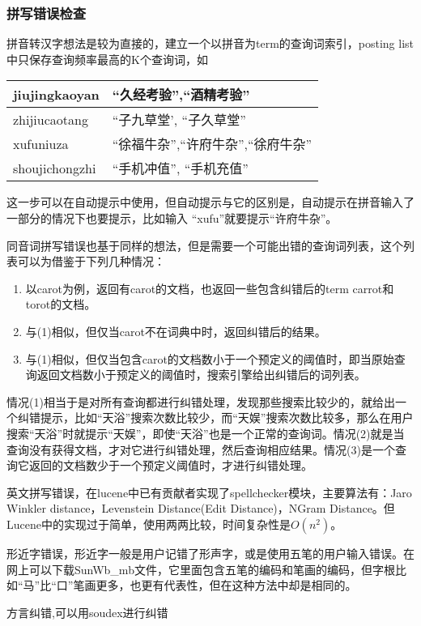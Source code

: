 \subsubsection{拼写错误检查}
\par 拼音转汉字想法是较为直接的，建立一个以拼音为term的查询词索引，posting list中只保存查询频率最高的K个查询词，如
\begin{table}[h]
  \centering
  \begin{tabular}{|l|l|}
\hline
jiujingkaoyan &“久经考验”,“酒精考验”\\ \hline
zhijiucaotang & “子九草堂', “子久草堂” \\ \hline
xufuniuza & “徐福牛杂”,“许府牛杂”,“徐府牛杂”\\ \hline
shoujichongzhi&“手机冲值”, “手机充值”\\ \hline
  \end{tabular}
\end{table}
\par 这一步可以在自动提示中使用，但自动提示与它的区别是，自动提示在拼音输入了一部分的情况下也要提示，比如输入 “xufu”就要提示“许府牛杂”。
\par 同音词拼写错误也基于同样的想法，但是需要一个可能出错的查询词列表，这个列表可以为借鉴于下列几种情况：
\begin{enumerate}[(1)]
\item 以carot为例，返回有carot的文档，也返回一些包含纠错后的term carrot和torot的文档。
\item 与(1)相似，但仅当carot不在词典中时，返回纠错后的结果。
\item 与(1)相似，但仅当包含carot的文档数小于一个预定义的阈值时，即当原始查询返回文档数小于预定义的阈值时，搜索引擎给出纠错后的词列表。
\end{enumerate}
\par 情况(1)相当于是对所有查询都进行纠错处理，发现那些搜索比较少的，就给出一个纠错提示，比如“天浴”搜索次数比较少，而“天娱”搜索次数比较多，那么在用户搜索“天浴”时就提示“天娱”，即使“天浴”也是一个正常的查询词。情况(2)就是当查询没有获得文档，才对它进行纠错处理，然后查询相应结果。情况(3)是一个查询它返回的文档数少于一个预定义阈值时，才进行纠错处理。
\par 英文拼写错误，在lucene中已有贡献者实现了spellchecker模块，主要算法有：Jaro Winkler distance，Levenstein Distance(Edit Distance)，NGram Distance。但Lucene中的实现过于简单，使用两两比较，时间复杂性是$O(n^2)$。
\par 形近字错误，形近字一般是用户记错了形声字，或是使用五笔的用户输入错误。在网上可以下载SunWb\_mb文件，它里面包含五笔的编码和笔画的编码，但字根比如“马”比“口”笔画更多，也更有代表性，但在这种方法中却是相同的。
\par 方言纠错,可以用soudex进行纠错
